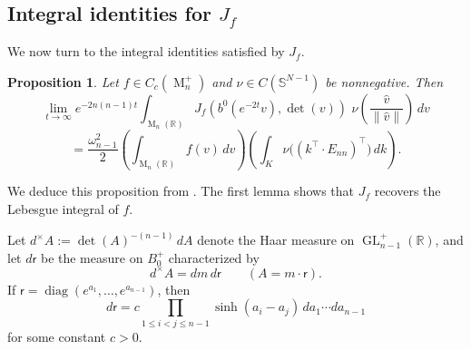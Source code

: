 \documentclass[reqno,11pt]{amsart}
\numberwithin{equation}{section}
\newtheorem{proposition}[theorem]{Proposition}
\theoremstyle{definition}
\theoremstyle{remark}
\newcommand{\op}{\operatorname}
\newcommand{\R}{\mathbb R}
\newcommand{\M}{\op{M}}
\renewcommand{\S}{\mathbb S}
\newcommand{\bp}{B_0^+}
\newcommand{\GL}{\op{GL}}
\newcommand{\diag}{\op{diag}}
\renewcommand{\r}{\mathsf r}
\begin{document}
\subsection{Integral identities for $J_f$}
We now turn to the integral identities satisfied by $J_f$.
\begin{proposition}\label{emm3.9}
Let $f\in C_c({\M_n^+})$ and $\nu\in C(\S^{N-1})$ be nonnegative.
Then
$$
\lim_{t\to\infty}
e^{-2n(n-1)t}
\int_{\M_n(\R)}
{J}_f( b^0(e^{-2t} v),\det(v))\,
\,\nu\!\left(\frac{\widehat v}{\|\widehat v\|}\right)\,dv
$$
$$
=
\frac{\omega_{n-1}^2}{2}
\left(\int_{\M_n(\R)} f(v)\,dv\right)
\left(\int_K \nu\bigl((k^{\intercal}\!\cdot E_{nn})^{\intercal}\bigr)\,dk\right).
$$
\end{proposition}

We deduce this proposition from . The first lemma shows that $J_f$ recovers the Lebesgue integral of $f$.

Let $d^\times A:=\det(A)^{-(n-1)}\,dA$ denote the Haar measure on
$\GL_{n-1}^+(\R)$, and let $d\r$ be the measure on $\bp$ characterized by
\begin{equation}\label{meas}
d^\times A=dm\,d\r
\qquad(A=m\cdot\r).
\end{equation}
If $\r=\diag(e^{a_1},\ldots,e^{a_{n-1}})$, then
\begin{equation}\label{eq:Haarmeasureformula}
d\r
=c\prod_{1\le i<j\le n-1}\sinh(a_i-a_j)
\,da_1\cdots da_{n-1}
\end{equation}
for some constant $c>0$.
\end{document}
